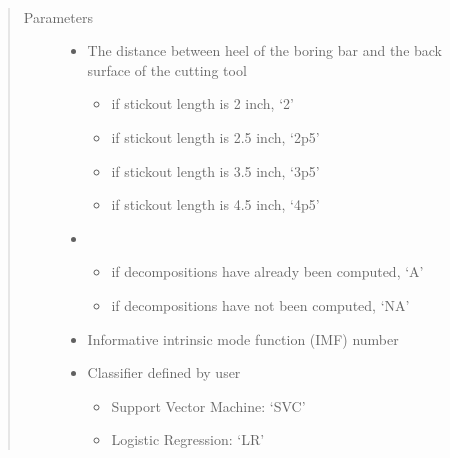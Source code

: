 \documentclass[letterpaper,10pt,english]{sphinxmanual}
\begin{document}
\begin{fulllineitems}
\label{\detokenize{EEMD:EEMD_Feature_Extraction.EEMD_Feature_Extraction}}~\begin{quote}\begin{description}
\item[{Parameters}] \leavevmode\begin{itemize}
\item {} 
 \textendash{} 
The distance between heel of the boring bar and the back surface of the cutting tool
\begin{itemize}
\item {} 
if stickout length is 2 inch, ‘2’

\item {} 
if stickout length is 2.5 inch, ‘2p5’

\item {} 
if stickout length is 3.5 inch, ‘3p5’

\item {} 
if stickout length is 4.5 inch, ‘4p5’

\end{itemize}


\item {} 
 \textendash{} \begin{itemize}
\item {} 
if decompositions have already been computed, ‘A’

\item {} 
if decompositions have not been computed, ‘NA’

\end{itemize}


\item {} 
 \textendash{} Informative intrinsic mode function (IMF) number

\item {} 
 \textendash{} 
Classifier defined by user
\begin{itemize}
\item {} 
Support Vector Machine: ‘SVC’

\item {} 
Logistic Regression: ‘LR’


\end{itemize}
\end{itemize}
\end{description}
\end{quote}
\end{fulllineitems}
\end{document}
